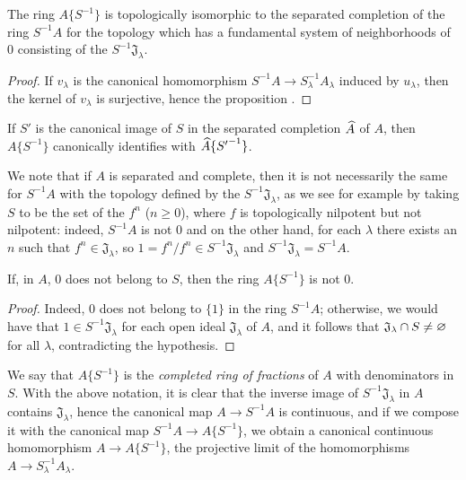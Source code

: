\begin{proposition}[7.6.2]
\label{0.7.6.2}
The ring $A\{S^{-1}\}$ is topologically isomorphic to the separated completion of the ring
$S^{-1}A$ for the topology which has a fundamental system of neighborhoods of $0$ consisting of
the $S^{-1}\mathfrak{J}_\lambda$.
\end{proposition}

\begin{proof}
\label{proof-0.7.6.2}
If $v_\lambda$ is the canonical homomorphism $S^{-1}A\to S_\lambda^{-1}A_\lambda$ induced
by $u_\lambda$, then the kernel of $v_\lambda$ is surjective, hence the proposition .
\end{proof}

\begin{corollary}[7.6.3]
\label{0.7.6.3}
If $S'$ is the canonical image of $S$ in the separated completion $\widehat{A}$ of $A$, then
$A\{S^{-1}\}$ canonically identifies with $\widehat{A}\{{S'}^{-1}\}$.
\end{corollary}

We note that if $A$ is separated and complete, then it is not necessarily the same for
$S^{-1}A$ with the topology defined by the $S^{-1}\mathfrak{J}_\lambda$, as we see for example
by taking $S$ to be the set of the $f^n$ ($n\geq 0$), where $f$ is topologically nilpotent
but not nilpotent: indeed, $S^{-1}A$ is not $0$ and on the other hand, for each $\lambda$ there
exists an $n$ such that $f^n\in\mathfrak{J}_\lambda$, so $1=f^n/f^n\in S^{-1}\mathfrak{J}_\lambda$
and $S^{-1}\mathfrak{J}_\lambda=S^{-1}A$.

\begin{corollary}[7.6.4]
\label{0.7.6.4}
If, in $A$, $0$ does not belong to $S$, then the ring $A\{S^{-1}\}$ is not $0$.
\end{corollary}

\begin{proof}
\label{proof-0.7.6.4}
Indeed, $0$ does not belong to $\{1\}$ in the ring $S^{-1}A$; otherwise, we would have that
$1\in S^{-1}\mathfrak{J}_\lambda$ for each open ideal $\mathfrak{J}_\lambda$ of $A$, and it
follows that $\mathfrak{J}_\lambda\cap S\neq\varnothing$ for all $\lambda$, contradicting the
hypothesis.
\end{proof}

\begin{env}[7.6.5]
\label{0.7.6.5}
We say that $A\{S^{-1}\}$ is the \emph{completed ring of fractions} of $A$ with denominators
in $S$. With the above notation, it is clear that the inverse image of $S^{-1}\mathfrak{J}_\lambda$
in $A$ contains $\mathfrak{J}_\lambda$, hence the canonical map $A\to S^{-1}A$ is continuous, and if
we compose it with the canonical map $S^{-1}A\to A\{S^{-1}\}$, we obtain a canonical continuous
homomorphism $A\to A\{S^{-1}\}$, the projective limit of the homomorphisms
$A\to S_\lambda^{-1}A_\lambda$.
\end{env}

